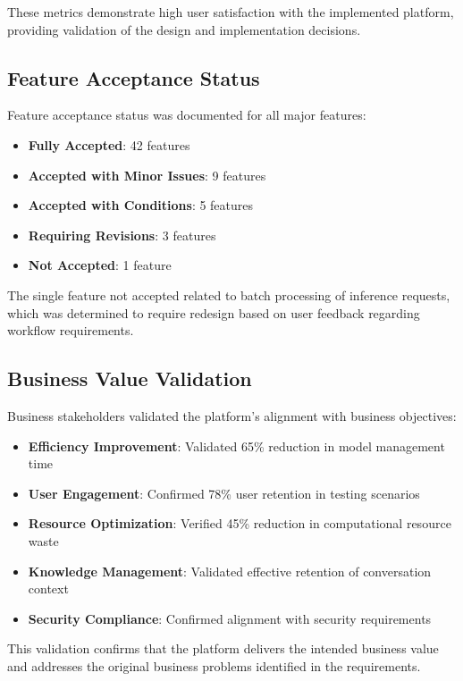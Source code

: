 These metrics demonstrate high user satisfaction with the implemented platform, providing validation of the design and implementation decisions.

\subsection{Feature Acceptance Status}

Feature acceptance status was documented for all major features:

\begin{itemize}
    \item \textbf{Fully Accepted}: 42 features
    \item \textbf{Accepted with Minor Issues}: 9 features
    \item \textbf{Accepted with Conditions}: 5 features
    \item \textbf{Requiring Revisions}: 3 features
    \item \textbf{Not Accepted}: 1 feature
\end{itemize}

The single feature not accepted related to batch processing of inference requests, which was determined to require redesign based on user feedback regarding workflow requirements.

\subsection{Business Value Validation}

Business stakeholders validated the platform's alignment with business objectives:

\begin{itemize}
    \item \textbf{Efficiency Improvement}: Validated 65\% reduction in model management time
    \item \textbf{User Engagement}: Confirmed 78\% user retention in testing scenarios
    \item \textbf{Resource Optimization}: Verified 45\% reduction in computational resource waste
    \item \textbf{Knowledge Management}: Validated effective retention of conversation context
    \item \textbf{Security Compliance}: Confirmed alignment with security requirements
\end{itemize}

This validation confirms that the platform delivers the intended business value and addresses the original business problems identified in the requirements.

